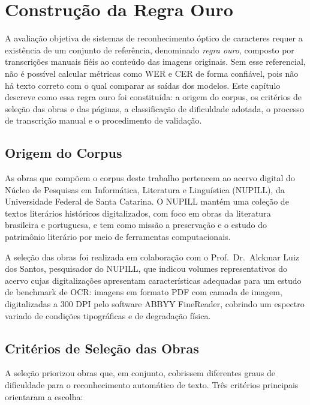 \documentclass[
  12pt,
  oneside,
  a4paper,
  chapter=TITLE,
  section=TITLE,
  english,
  brazil
]{abntex2}
\begin{document}
\chapter{Construção da Regra Ouro}

A avaliação objetiva de sistemas de reconhecimento óptico de caracteres requer a
existência de um conjunto de referência, denominado \textit{regra ouro}, composto por
transcrições manuais fiéis ao conteúdo das imagens originais. Sem esse referencial, não
é possível calcular métricas como WER e CER de forma confiável, pois não há texto correto
com o qual comparar as saídas dos modelos. Este capítulo descreve como essa regra ouro
foi constituída: a origem do corpus, os critérios de seleção das obras e das páginas, a
classificação de dificuldade adotada, o processo de transcrição manual e o procedimento
de validação.

\section{Origem do Corpus}

As obras que compõem o corpus deste trabalho pertencem ao acervo digital do Núcleo de
Pesquisas em Informática, Literatura e Linguística (NUPILL), da Universidade Federal de
Santa Catarina. O NUPILL mantém uma coleção de textos literários históricos digitalizados,
com foco em obras da literatura brasileira e portuguesa, e tem como missão a preservação
e o estudo do patrimônio literário por meio de ferramentas computacionais.

A seleção das obras foi realizada em colaboração com o Prof.\ Dr.\ Alckmar Luiz dos
Santos, pesquisador do NUPILL, que indicou volumes representativos do acervo cujas
digitalizações apresentam características adequadas para um estudo de benchmark de OCR:
imagens em formato PDF com camada de imagem, digitalizadas a 300 DPI pelo software ABBYY
FineReader, cobrindo um espectro variado de condições tipográficas e de degradação física.

\section{Critérios de Seleção das Obras}

A seleção priorizou obras que, em conjunto, cobrissem diferentes graus de dificuldade
para o reconhecimento automático de texto. Três critérios principais orientaram a escolha:
\end{document}
